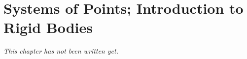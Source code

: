 \chapter{Systems of Points; Introduction to Rigid Bodies}\label{ch:b1:systems-of-points}


\emph{This chapter has not been written yet.}
